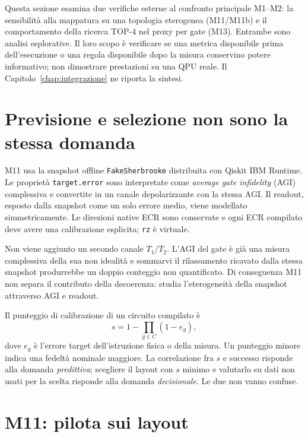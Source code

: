 \begin{onehalfspace}

Questa sezione esamina due verifiche esterne al confronto principale M1--M2: la sensibilit\`a alla mappatura su una topologia eterogenea (M11/M11b) e il comportamento della ricerca TOP-4 nel proxy per gate (M13). Entrambe sono analisi esplorative. Il loro scopo \`e verificare se una metrica disponibile prima dell'esecuzione o una regola disponibile dopo la misura conservino potere informativo; non dimostrare prestazioni su una QPU reale. Il Capitolo~\ref{chap:integrazione} ne riporta la sintesi.

\section{Previsione e selezione non sono la stessa domanda}
\label{sec:app_comp_previsione}

M11 usa la snapshot offline \texttt{FakeSherbrooke} distribuita con Qiskit IBM Runtime. Le propriet\`a \texttt{target.error} sono interpretate come \emph{average gate infidelity} (AGI) complessiva e convertite in un canale depolarizzante con la stessa AGI. Il readout, esposto dalla snapshot come un solo errore medio, viene modellato simmetricamente. Le direzioni native ECR sono conservate e ogni ECR compilato deve avere una calibrazione esplicita; \texttt{rz} \`e virtuale.

Non viene aggiunto un secondo canale $T_1/T_2$. L'AGI del gate \`e gi\`a una misura complessiva della sua non idealit\`a e sommarvi il rilassamento ricavato dalla stessa snapshot produrrebbe un doppio conteggio non quantificato. Di conseguenza M11 non separa il contributo della decoerenza: studia l'eterogeneit\`a della snapshot attraverso AGI e readout.

Il punteggio di calibrazione di un circuito compilato \`e
\begin{equation}
    s = 1-\prod_{g\in C}(1-e_g),
\end{equation}
dove $e_g$ \`e l'errore target dell'istruzione fisica o della misura. Un punteggio minore indica una fedelt\`a nominale maggiore. La correlazione fra $s$ e successo risponde alla domanda \emph{predittiva}; scegliere il layout con $s$ minimo e valutarlo su dati non usati per la scelta risponde alla domanda \emph{decisionale}. Le due non vanno confuse.

\section{M11: pilota sui layout}
\label{sec:app_comp_pilota}


\end{onehalfspace}
